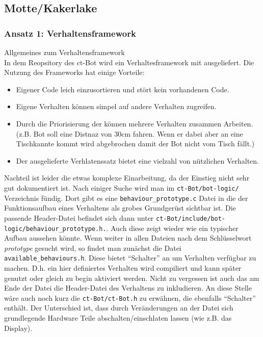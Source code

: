 \subsection{Motte/Kakerlake}
\label{motte_kakerlake}

\subsubsection{Ansatz 1: Verhaltensframework}
Allgemeines zum Verhaltensframework \\
In dem Reopsitory des ct-Bot wird ein Verhaltesframework mit ausgeliefert.
Die Nutzung des Frameworks hat einige Vorteile:
\begin{itemize}
	\item Eigener Code leich einzusortieren und stört kein vorhandenen Code.
	\item Eigene Verhalten können simpel auf andere Verhalten zugreifen.
	\item Durch die Priorisierung der können mehrere Verhalten zusammen Arbeiten.
		(z.B. Bot soll eine Distnaz von 30cm fahren. Wenn er dabei aber an eine
		Tischkannte kommt wird abgebrochen damit der Bot nicht vom Tisch fällt.)
	\item Der ausgelieferte Verhlatenssatz bietet eine vielzahl von nützlichen
		Verhalten.
\end{itemize}
Nachteil ist leider die etwas komplexe Einarbeitung, da der Einstieg nicht sehr gut
dokumentiert ist. Nach einiger Suche wird man im \verb+ct-Bot/bot-logic/+ 
Verzeichnis fündig. Dort gibt es eine \verb+behaviour_prototype.c+ Datei
in die der Funktionsaufbau eines Verhaltens als grobes Grundgerüst sichtbar ist.
Die passende Header-Datei befindet sich dann unter
\verb+ct-Bot/include/bot-logic/behaviour_prototype.h.+. Auch diese
zeigt wieder wie ein typischer Aufbau aussehen könnte. Wenn weiter in allen Dateien
nach dem Schlüsselwort \textit{prototype} gesucht wird, so findet man zunächst
die Datei \\ \verb+available_behaviours.h+. Diese bietet "`Schalter"'
an um Verhalten verfügbar zu machen. D.h. ein hier definiertes Verhalten
wird compiliert und kann später genutzt oder gleich zu begin aktiviert werden.
Nicht zu vergessen ist auch das am Ende der Datei die Header-Datei des
Verhaltens zu inkludieren. An diese Stelle wäre auch noch kurz die
\verb+ct-Bot/ct-Bot.h+ zu erwähnen, die ebenfalls "`Schalter"' enthält.
Der Unterschied ist, dass durch Veränderungen an der Datei sich grundlegende
Hardware Teile abschalten/einschlaten lassen (wie z.B. das Display).
